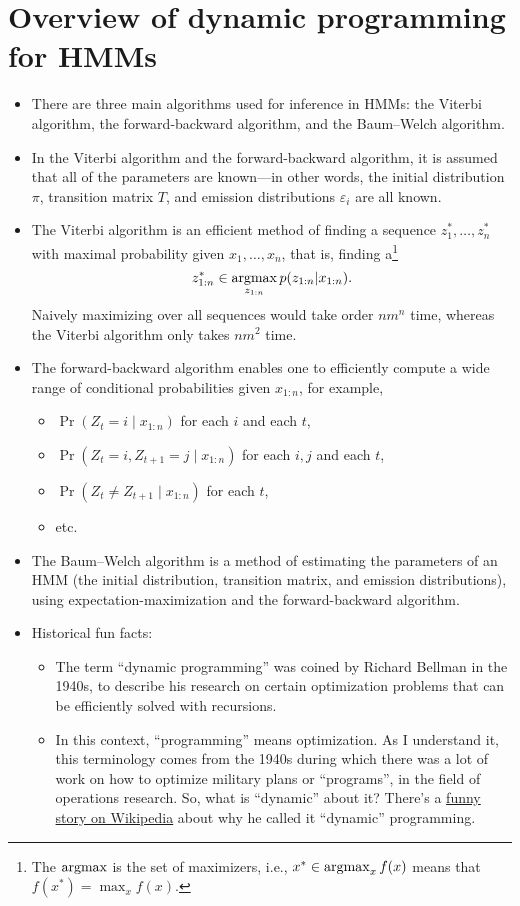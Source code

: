 \documentclass[12pt]{article}
\begin{document}
\section{Overview of dynamic programming for HMMs}

\begin{itemize}
\item There are three main algorithms used for inference in HMMs: the Viterbi algorithm, the forward-backward algorithm, and the Baum--Welch algorithm.
\item In the Viterbi algorithm and the forward-backward algorithm, it is assumed that all of the parameters are known---in other words, the initial distribution $\pi$, transition matrix $T$, and emission distributions $\varepsilon_i$ are all known.
\item The Viterbi algorithm is an efficient method of finding a sequence $z_1^*,\ldots,z_n^*$ with maximal probability given $x_1,\ldots,x_n$, that is, finding a\footnote{The $\operatorname*{argmax}$ is the set of maximizers, i.e., $x^* \in \operatorname*{argmax}_x f(x)$ means that $f(x^*) = \max_x f(x)$.}
$$ z_{1:n}^* \in \operatorname*{argmax}_{z_{1:n}} p(z_{1:n} | x_{1:n}). $$
Naively maximizing over all sequences would take order $n m^n$ time, whereas the Viterbi algorithm only takes $n m^2$ time.
\item The forward-backward algorithm enables one to efficiently compute a wide range of conditional probabilities given $x_{1:n}$, for example,
\begin{itemize}
\item $\Pr(Z_t = i \mid x_{1:n})$ for each $i$ and each $t$,
\item $\Pr(Z_t = i, Z_{t+1}=j \mid x_{1:n})$ for each $i,j$ and each $t$,
\item $\Pr(Z_t \neq Z_{t+1} \mid x_{1:n})$ for each $t$,
\item etc.
\end{itemize}
\item The Baum--Welch algorithm is a method of estimating the parameters of an HMM (the initial distribution, transition matrix, and emission distributions), using expectation-maximization and the forward-backward algorithm.
\item Historical fun facts:
\begin{itemize}
\item The term ``dynamic programming'' was coined by Richard Bellman in the 1940s, to describe his research on certain optimization problems that can be efficiently solved with recursions.
\item In this context, ``programming'' means optimization. As I understand it, this terminology comes from the 1940s during which there was a lot of work on how to optimize military plans or ``programs'', in the field of operations research. So, what is ``dynamic'' about it? There's a \href{https://en.wikipedia.org/wiki/Dynamic_programming#History}{funny story on Wikipedia} about why he called it ``dynamic'' programming.
\end{itemize}
\end{itemize}
\end{document}
